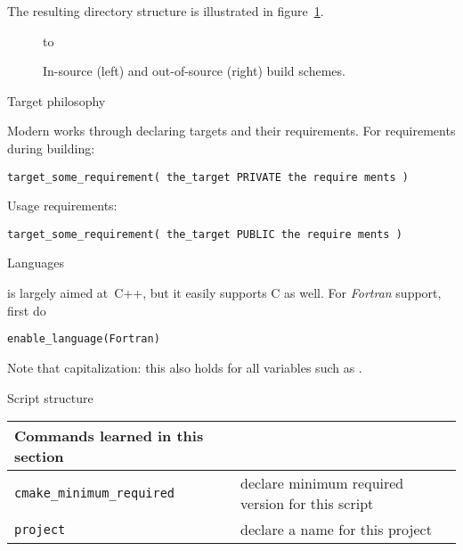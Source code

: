 The resulting directory structure is illustrated in figure~\ref{fig:cmake-buildinstall}.

\begin{figure}[ht]
  \hbox to \textwidth\bgroup
  \begin{minipage}{.45\textwidth}
  \end{minipage}
  \hss
  \begin{minipage}{.45\textwidth}
  \end{minipage}
  \egroup
  \caption{In-source (left) and out-of-source (right) build schemes.}
  \label{fig:cmake-buildinstall}
\end{figure}

 {Target philosophy}

Modern  works through declaring targets and their requirements.
For requirements during building:
\begin{lstlisting}
target_some_requirement( the_target PRIVATE the require ments )
\end{lstlisting}
Usage requirements:
\begin{lstlisting}
target_some_requirement( the_target PUBLIC the require ments )
\end{lstlisting}

 {Languages}

 is largely aimed at~C++, but it easily supports C as well.
For \emph{Fortran} support,
first do
\begin{lstlisting}
enable_language(Fortran)
\end{lstlisting}
Note that capitalization: this also holds for all variables
such as .

 {Script structure}

\begin{tabular}{lp{3in}}
  \toprule
  Commands learned in this section\\
  \midrule
  \lstinline+cmake_minimum_required+&declare minimum required version for this script\\
  \lstinline+project+&declare a name for this project\\
  \bottomrule
\end{tabular}

